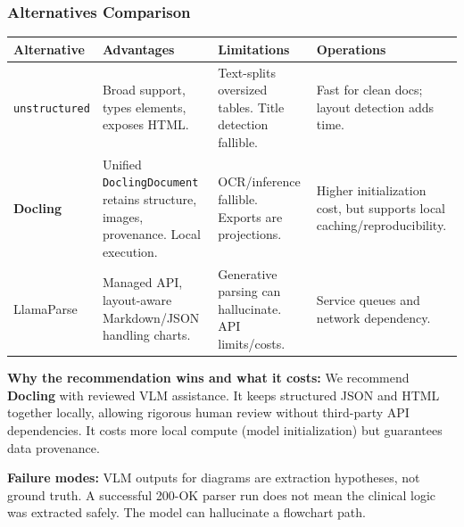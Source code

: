 \documentclass[11pt,a4paper]{article}
\begin{document}
\subsubsection{Alternatives Comparison}
\begin{table}[ht]
\centering
\begin{tabularx}{\textwidth}{lXXX}
\toprule
\textbf{Alternative} & \textbf{Advantages} & \textbf{Limitations} & \textbf{Operations} \\
\midrule
\texttt{unstructured} & Broad support, types elements, exposes HTML. & Text-splits oversized tables. Title detection fallible. & Fast for clean docs; layout detection adds time. \\
\textbf{Docling} & Unified \texttt{DoclingDocument} retains structure, images, provenance. Local execution. & OCR/inference fallible. Exports are projections. & Higher initialization cost, but supports local caching/reproducibility. \\
LlamaParse & Managed API, layout-aware Markdown/JSON handling charts. & Generative parsing can hallucinate. API limits/costs. & Service queues and network dependency. \\
\bottomrule
\end{tabularx}
\end{table}

\textbf{Why the recommendation wins and what it costs:} We recommend \textbf{Docling} with reviewed VLM assistance. It keeps structured JSON and HTML together locally, allowing rigorous human review without third-party API dependencies. It costs more local compute (model initialization) but guarantees data provenance. 

\textbf{Failure modes:} VLM outputs for diagrams are extraction hypotheses, not ground truth. A successful 200-OK parser run does not mean the clinical logic was extracted safely. The model can hallucinate a flowchart path.
\end{document}

